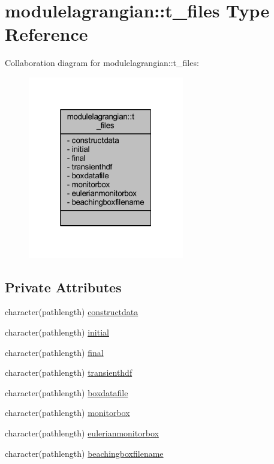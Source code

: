 \hypertarget{structmodulelagrangian_1_1t__files}{}\section{modulelagrangian\+:\+:t\+\_\+files Type Reference}
\label{structmodulelagrangian_1_1t__files}


Collaboration diagram for modulelagrangian\+:\+:t\+\_\+files\+:\nopagebreak
\begin{figure}[H]
\begin{center}
\leavevmode
\includegraphics[width=193pt]{structmodulelagrangian_1_1t__files__coll__graph}
\end{center}
\end{figure}
\subsection*{Private Attributes}
\begin{DoxyCompactItemize}
\item 
character(pathlength) \mbox{\hyperlink{structmodulelagrangian_1_1t__files_af570d20dd366e38c201ec650c749f944}{constructdata}}
\item 
character(pathlength) \mbox{\hyperlink{structmodulelagrangian_1_1t__files_ad23468e748eb57459cfbc6afe37f3a90}{initial}}
\item 
character(pathlength) \mbox{\hyperlink{structmodulelagrangian_1_1t__files_a30241f3371f40a6884d96a6b46db55ad}{final}}
\item 
character(pathlength) \mbox{\hyperlink{structmodulelagrangian_1_1t__files_a6f50904a622eb5ed4a3e9155ba763d34}{transienthdf}}
\item 
character(pathlength) \mbox{\hyperlink{structmodulelagrangian_1_1t__files_a5906b8f0de09dc10d697d2c12bcd9b47}{boxdatafile}}
\item 
character(pathlength) \mbox{\hyperlink{structmodulelagrangian_1_1t__files_ade5f464778af9fbea91f134562fb86b5}{monitorbox}}
\item 
character(pathlength) \mbox{\hyperlink{structmodulelagrangian_1_1t__files_a156406a1a024463bbe2304854ad9175c}{eulerianmonitorbox}}
\item 
character(pathlength) \mbox{\hyperlink{structmodulelagrangian_1_1t__files_aa757b7b99a2cb2975827aa11c88f665a}{beachingboxfilename}}
\end{DoxyCompactItemize}


